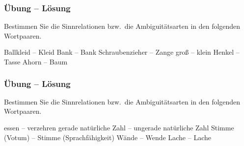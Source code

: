 
	
	\begin{frame}
		\frametitle{Übung -- Lösung}

Bestimmen Sie die Sinnrelationen bzw.\ die Ambiguitätsarten in den folgenden Wortpaaren.

\settowidth{}
\begin{exe}	
	 Ballkleid -- Kleid \pause {}
	 Bank -- Bank \pause {}
	 Schraubenzieher -- Zange \pause {}
	 gro\ss{} -- klein \pause {}
	 Henkel -- Tasse \pause {}
	 Ahorn -- Baum \pause {}
\end{exe}

\end{frame}


\begin{frame}
	\frametitle{Übung -- Lösung}
	
Bestimmen Sie die Sinnrelationen bzw.\ die Ambiguitätsarten in den folgenden Wortpaaren.
	
\settowidth{}
\begin{exe}
	 essen -- verzehren \pause {}
	 gerade natürliche Zahl -- ungerade  natürliche Zahl \pause {}
	 Stimme (Votum) -- Stimme (Sprachfähigkeit) \pause {}
	 Wände -- Wende \pause {}
	 Lache -- Lache \pause {}
\end{exe}

\end{frame}